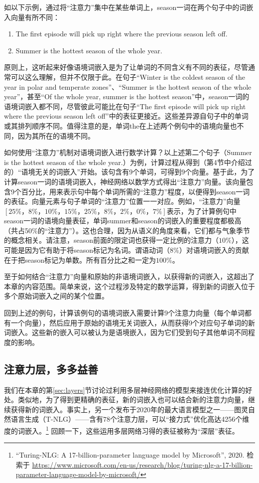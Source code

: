 \documentclass[output=paper,colorlinks,citecolor=brown]{langscibook}
\begin{document}
如以下示例，通过将“注意力”集中在某些单词上，season一词在两个句子中的词嵌入向量有所不同：

\begin{enumerate}
  \item The first episode will pick up right where the previous season left off.
  \item Summer is the hottest season of the whole year.
\end{enumerate}

原则上，这听起来好像语境词嵌入是为了让单词的不同含义有不同的表征，尽管通常可以这么理解，但并不仅限于此。在句子“Winter is the coldest season of the year in polar and temperate zones”、“Summer is the hottest season of the whole year”，甚至“Of the whole year, summer is the hottest season”中，season一词的语境词嵌入都不同，尽管彼此可能比在句子“The first episode will pick up right where the previous season left off”中的表征更接近。这些差异源自句子中的单词或其排列顺序不同。值得注意的是，单词the在上述两个例句中的语境向量也不同，因为其所在的语境不同。

如何使用“注意力”机制对语境词嵌入进行数学计算？以上述第二个句子（Summer is the hottest season of the whole year.）为例，计算过程从得到（第4节中介绍过的）“语境无关的词嵌入”开始。该句含有9个单词，可得到9个向量。基于此，为了计算season一词的语境词嵌入，神经网络以数学方式得出“注意力”向量。该向量包含9个百分比，用来表示句中每个单词所需的“注意力”程度，以便得到season一词的表征。向量元素与句子单词的“注意力”位置一一对应。例如，“注意力”向量$[25\%，8\%，10\%，15\%，25\%，8\%，2\%，0\%，7\%]$表示，为了计算例句中season一词的语境向量表征，单词summer和season的词嵌入的重要程度都极高（共占50\%的“注意力”）。这也合理，因为从语义的角度来看，它们都与气象季节的概念相关。请注意，season前面的限定词也获得一定比例的注意力（$10\%$），这可能是因为它有助于将season标记为名词。谓语动词（$8\%$）对语境词嵌入的贡献在于把season标记为单数。所有百分比之和一定为$100\%$。

至于如何结合“注意力”向量和原始的非语境词嵌入，以获得新的词嵌入，这超出了本章的内容范围。简单来说，这个过程涉及特定的数学运算，得到新的词嵌入位于多个原始词嵌入之间的某个位置。

回到上述的例句，计算该例句的语境词嵌入需要计算9个注意力向量（每个单词都有一个向量），然后应用于原始的语境无关词嵌入，从而获得9个对应句子单词的新词嵌入。这些新的嵌入可以被认为是语境嵌入，因为它们受到句子其他单词不同程度的影响。


\subsection{注意力层，多多益善}
我们在本章的第\ref{sec:layers}节讨论过利用多层神经网络的模型来接连优化计算的好处。类似地，为了得到更精确的表征，新的词嵌入也可以结合新的注意力向量，继续获得新的词嵌入。事实上，另一个发布于2020年的最大语言模型之一——图灵自然语言生成（T-NLG）——含有$78$个注意力层，可以“接力式”优化高达4256个维度的词嵌入。\footnote{``Turing-NLG: A 17-billion-parameter language model by Microsoft'', 2020. 检索于 \url{https://www.microsoft.com/en-us/research/blog/turing-nlg-a-17-billion-parameter-language-model-by-microsoft/}} 回顾一下，这些运用多层网络习得的表征被称为“深层”表征。
\end{document}
